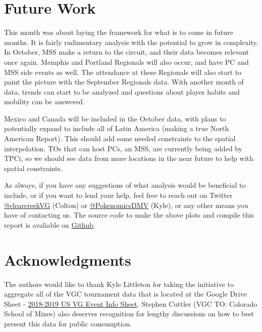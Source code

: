 \documentclass[11pt,twocolumn]{article}
\begin{document}
\section*{Future Work}

This month was about laying the framework for what is to come in future months. It is fairly rudimentary analysis with the potential to grow in complexity. In October, MSS make a return to the circuit, and their data becomes relevant once again. Memphis and Portland Regionals will also occur, and have PC and MSS side events as well. The attendance at these Regionals will also start to paint the picture with the September Regionals data. With another month of data, trends can start to be analyzed and questions about player habits and mobility can be answered. 

Mexico and Canada will be included in the October data, with plans to potentially expand to include all of Latin America (making a true North American Report). This should add some needed constraints to the spatial interpolation. TOs that can host PCs, an MSS, are currently being added by TPCi, so we should see data from more locations in the near future to help with spatial constraints. 

As always, if you have any suggestions of what analysis would be beneficial to include, or if you want to lend your help, feel free to reach out on Twitter \href{https://twitter.com/clearcreekVG}{@clearcreekVG} (Colton) or \href{https://twitter.com/PokenomicsDMV}{@PokenomicsDMV} (Kyle), or any other means you have of contacting us. The source code to make the above plots and compile this report is avaliable on \href{https://github.com/ckohnke/pkmheatmap}{Github}.

\section*{Acknowledgments}

The authors would like to thank Kyle Littleton for taking the initiative to aggregate all of the VGC tournament data that is located at the Google Drive Sheet - \href{https://docs.google.com/spreadsheets/d/1ma2g3MTRTx3fUCun9awvshfAFoD9gRbB7rpf7qXve-k/edit?usp=sharing}{2018-2019 US VG Event Info Sheet}. Stephen Cuttler (VGC TO: Colorado School of Mines) also deserves recognition for lengthy discussions on how to best present this data for public consumption.
\end{document}
